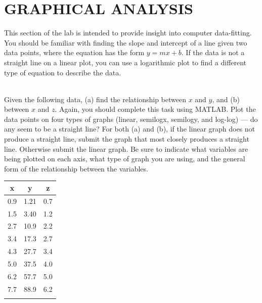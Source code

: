 \documentclass[11pt,letterpaper]{article}
\newcounter{question}[section]
\begin{document}
\section{GRAPHICAL ANALYSIS}
This section of the lab is intended to provide insight into computer data-fitting.  You should be familiar with finding the slope and intercept of a line given two data points, where the equation has the form $y=mx+b$.  If the data is not a straight line on a linear plot, you can use a logarithmic plot to find a different type of equation to describe the data.

\\ 
Given the following data, (a) find the relationship between $x$ and $y$, and (b) between $x$ and $z$.  Again, you should complete this task using MATLAB.  Plot the data points on four types of graphs (linear, semilogx, semilogy, and log-log) --- do any seem to be a straight line? For both (a) and (b), if the linear graph does not produce a straight line, submit the graph that most closely produces a straight line. Otherwise submit the linear graph. Be sure to indicate what variables are being plotted on each axis, what type of graph you are using, and the general form of the relationship between the variables. 

\begin{tabular}{ccc}
x & y & z\\
\hline
0.9 & 1.21 & 0.7\\
1.5 & 3.40 & 1.2\\
2.7 & 10.9 & 2.2\\
3.4 & 17.3 & 2.7\\
4.3 & 27.7 & 3.4\\
5.0 & 37.5 & 4.0\\
6.2 & 57.7 & 5.0\\
7.7 & 88.9 & 6.2\\
\hline\\
\end{tabular}
\vspace{.5cm}
\end{document}
